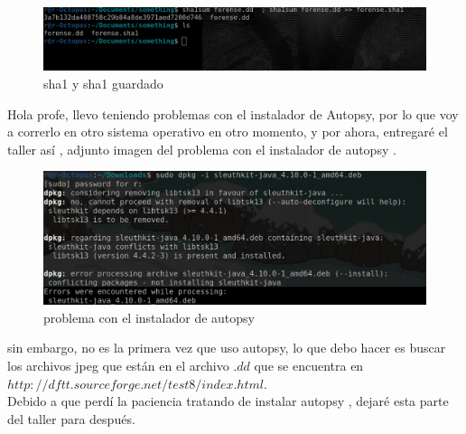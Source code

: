 \documentclass[10pt,a4paper]{article} %
\begin{document}
        \begin{figure}[h!]
            \centering
            \includegraphics[width=0.8\linewidth]{sha1.png}
            \caption{sha1 y sha1 guardado}
            \label{fig}
        \end{figure}

        \color{red} Hola profe, llevo teniendo problemas con el instalador de
        Autopsy, por lo que voy a correrlo en otro sistema operativo en otro
        momento, y por ahora, entregaré el taller así , adjunto imagen del
        problema con el instalador de autopsy
        \color{black} .

        \begin{figure}[h!]
            \centering
            \includegraphics[width=0.8\linewidth]{autopsy.png}
            \caption{problema con el instalador de autopsy}
            \label{fig}
        \end{figure}

        sin embargo, no es la primera vez que uso autopsy, lo que debo hacer es
        buscar los archivos jpeg que están en el archivo $.dd$ que se encuentra
        en $http://dftt.sourceforge.net/test8/index.html$.
        \\
         Debido a que perdí
        la paciencia tratando de instalar autopsy , dejaré esta parte del
        taller para después.
























    \nocite{*}
    
    
\end{document}

